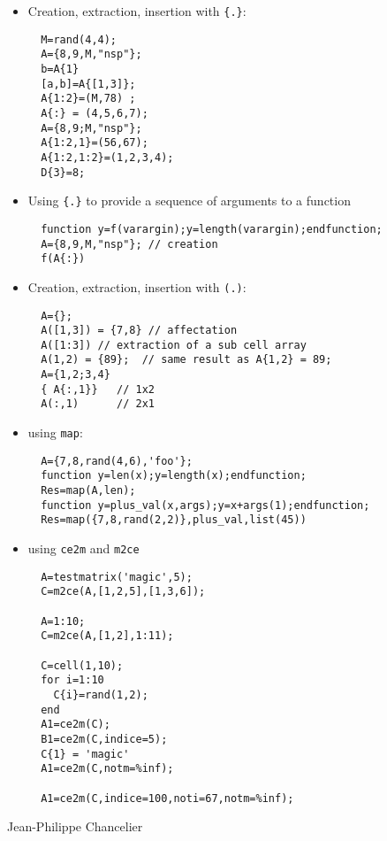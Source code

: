 \begin{examples}
\begin{itemize}
\item Creation, extraction, insertion with \verb+{.}+:
\begin{Verbatim}
  M=rand(4,4);
  A={8,9,M,"nsp"};  
  b=A{1} 	
  [a,b]=A{[1,3]};
  A{1:2}=(M,78) ; 
  A{:} = (4,5,6,7); 
  A={8,9;M,"nsp"};  
  A{1:2,1}=(56,67);
  A{1:2,1:2}=(1,2,3,4);
  D{3}=8;
\end{Verbatim}

\item Using \verb+{.}+ to provide a sequence of arguments to a function
\begin{Verbatim} 
  function y=f(varargin);y=length(varargin);endfunction;
  A={8,9,M,"nsp"}; // creation 
  f(A{:})
\end{Verbatim}
\item Creation, extraction, insertion with \verb+(.)+:
\begin{Verbatim}
  A={}; 
  A([1,3]) = {7,8} // affectation 
  A([1:3]) // extraction of a sub cell array
  A(1,2) = {89};  // same result as A{1,2} = 89;
  A={1,2;3,4}
  { A{:,1}}   // 1x2 
  A(:,1)      // 2x1 
\end{Verbatim}

\item using \verb+map+:
\begin{Verbatim}
  A={7,8,rand(4,6),'foo'}; 
  function y=len(x);y=length(x);endfunction;
  Res=map(A,len);
  function y=plus_val(x,args);y=x+args(1);endfunction;
  Res=map({7,8,rand(2,2)},plus_val,list(45))
\end{Verbatim}

\item using \verb!ce2m! and \verb!m2ce!

\begin{Verbatim}
  A=testmatrix('magic',5);
  C=m2ce(A,[1,2,5],[1,3,6]);

  A=1:10;
  C=m2ce(A,[1,2],1:11);
  
  C=cell(1,10);
  for i=1:10 
    C{i}=rand(1,2);
  end 
  A1=ce2m(C);
  B1=ce2m(C,indice=5); 
  C{1} = 'magic'
  A1=ce2m(C,notm=%inf);
  
  A1=ce2m(C,indice=100,noti=67,notm=%inf);
\end{Verbatim}

\end{itemize}

\end{examples}

\begin{authors}
  Jean-Philippe Chancelier
\end{authors}





